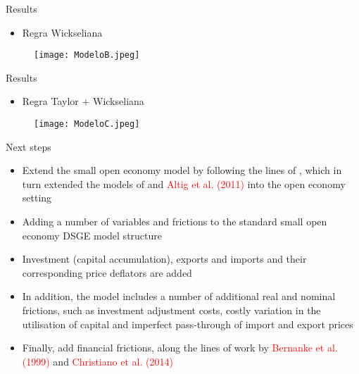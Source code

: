 \documentclass[9pt]{beamer}
\let\olditem\item
\renewcommand{\item}{%
\olditem\vspace{\fill}}
\begin{document}
\begin{frame}{Results}
\begin{itemize}
    \item Regra Wickseliana
\end{itemize}
\begin{figure}[H]
\centering
\texttt{[image: ModeloB.jpeg]}
\end{figure}

\end{frame}
\begin{frame}{Results}
\begin{itemize}
    \item Regra Taylor + Wickseliana
\end{itemize}
\begin{figure}[H]
\centering
\texttt{[image: ModeloC.jpeg]}
\end{figure}

\end{frame}
\begin{frame}{Next  steps}
\begin{itemize}
    
    \item Extend the small open economy model by following the lines of \textcolor{red}{\citet{Adolfson:2007}}, which in turn extended the models of \textcolor{red}{\citet{Christiano:2005}} and \textcolor{red}{Altig et al. (2011)} into the open economy setting
    
    \item Adding a number of variables and frictions to the standard small open economy DSGE model structure
    
    \item  Investment (capital accumulation), exports and imports and their corresponding price deflators are added 
    
    \item In addition, the model includes a number of additional real and nominal frictions, such as investment adjustment costs, costly variation in the utilisation of capital and imperfect pass-through of import and export prices 
    
    \item Finally, add financial frictions, along the lines of work by \textcolor{red}{Bernanke et al. (1999)} and \textcolor{red}{Christiano et al. (2014)} 
    
    
\end{itemize}


\end{frame}
\end{document}
